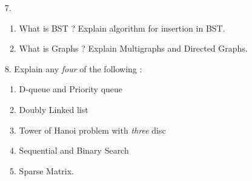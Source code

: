 \documentclass[12pt]{article}
\begin{document}
\begin{enumerate}
	\item[7.]
	\begin{enumerate}
		\item What is BST ? Explain algorithm for insertion in BST.
		\item What is Graphs ? Explain Multigraphs and Directed Graphs.
	\end{enumerate}

	\item[8.] Explain any \textit{four} of the following :
	\begin{enumerate}
		\item D-queue and Priority queue
		\item Doubly Linked list
		\item Tower of Hanoi problem with \textit{three} disc
		\item Sequential and Binary Search
		\item Sparse Matrix.
	\end{enumerate}

\end{enumerate}
\end{document}
